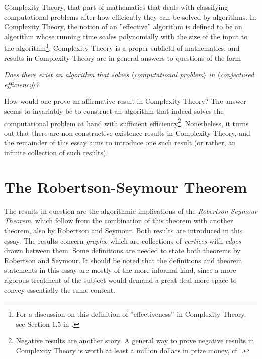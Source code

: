 Complexity Theory, that part of mathematics that deals with classifying computational problems after how efficiently they can be solved by algorithms. In Complexity Theory, the notion of an ''effective'' algorithm is defined to be an algorithm whose running time scales polynomially with the size of the input to the algorithm\footnote{For a discussion on this definition of ''effectiveness'' in Complexity Theory, see Section 1.5 in  \cite{aroraComputationalComplexityModern2009a}. }. Complexity Theory is a proper subfield of mathematics, and results in Complexity Theory are in general answers to questions of the form
\begin{center}
\emph{Does there exist an algorithm that solves $\langle$\emph{computational problem}$\rangle$ in $\langle$\emph{conjectured efficiency}$\rangle$?}
\end{center}
How would one prove an affirmative result in Complexity Theory? The answer seems to invariably be to construct an algorithm that indeed solves the computational problem at hand with sufficient efficiency\footnote{Negative results are another story. A general way to prove negative results in Complexity Theory is worth at least a million dollars in prize money, cf. \cite{VsNPProblem}.}. Nonetheless, it turns out that there are non-constructive existence results in Complexity Theory, and the remainder of this essay aims to introduce one such result (or rather, an infinite collection of such results).

\section{The Robertson-Seymour Theorem}
The results in question are the algorithmic implications of the \emph{Robertson-Seymour Theorem}, which follow from the combination of this theorem with another theorem, also by Robertson and Seymour. Both results are introduced in this essay. The results concern \emph{graphs}, which are collections of \emph{vertices} with \emph{edges} drawn between them. Some definitions are needed to state both theorems by Robertson and Seymour. It should be noted that the definitions and theorem statements in this essay are mostly of the more informal kind, since a more rigorous treatment of the subject would demand a great deal more space to convey essentially the same content.

